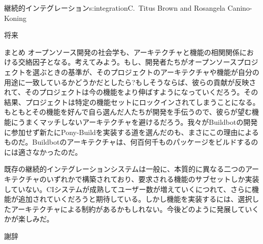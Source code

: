 \begin{aosachapter}{継続的インテグレーション}{s:integration}{C.\ Titus Brown and Rosangela Canino-Koning}
\begin{aosasect1}{将来}
\begin{aosasect2}{まとめ}
オープンソース開発の社会学も、アーキテクチャと機能の相関関係における交絡因子となる。考えてみよう。もし、開発者たちがオープンソースプロジェクトを選ぶときの基準が、そのプロジェクトのアーキテクチャや機能が自分の用途に一致しているかどうかだとしたら?もしそうならば、彼らの貢献が反映されて、そのプロジェクトは今の機能をより伸ばすようになっていくだろう。その結果、プロジェクトは特定の機能セットにロックインされてしまうことになる。もともとその機能を好んで自ら選んだ人たちが開発を手伝うので、彼らが望む機能にうまくマッチしないアーキテクチャを避けるだろう。我々がBuildbotの開発に参加せず新たにPony-Buildを実装する道を選んだのも、まさにこの理由によるものだ。Buildbotのアーキテクチャは、何百何千ものパッケージをビルドするのには適さなかったのだ。

既存の継続的インテグレーションシステムは一般に、本質的に異なる二つのアーキテクチャのいずれかで構築されており、要求される機能のサブセットしか実装していない。CIシステムが成熟してユーザー数が増えていくにつれて、さらに機能が追加されていくだろうと期待している。しかし機能を実装するには、選択したアーキテクチャによる制約があるかもしれない。今後どのように発展していくかが楽しみだ。

\end{aosasect2}

\begin{aosasect2}{謝辞}


\end{aosasect2}
\end{aosasect1}
\end{aosachapter}

